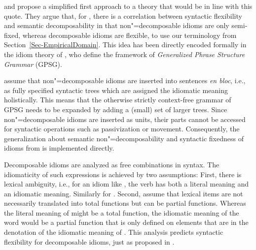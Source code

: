 \documentclass[output=paper
	        ,collection
	        ,collectionchapter
 	        ,biblatex
                ,babelshorthands
                ,newtxmath
                ,draftmode
                ,colorlinks, citecolor=brown
]{langscibook}
\begin{document}


\citet{WSN84a-u} and \citet{NSW94a} propose a simplified first approach to a theory that would be in line with this quote. They argue that, for , there is a correlation between syntactic flexibility and semantic decomposability in that non"=decomposable idioms are only semi-fixed, whereas decomposable idioms are flexible, to use our terminology from Section~\ref{Sec-EmpiricalDomain}. 
This idea has been directly encoded formally in the idiom theory of
\citet[Chapter~7]{GKPS85a}, who define the framework of 
\emph{Generalized Phrase Structure Grammar} (GPSG).

\citet{GKPS85a} assume that  non"=decomposable idioms are inserted into sentences \emph{en bloc}, i.e., as fully specified syntactic trees which are assigned the idiomatic meaning holistically. This means that the otherwise strictly context-free grammar of GPSG needs to be expanded by adding a (small) set of larger trees. 
Since non"=decomposable idioms are inserted as units, their parts cannot be accessed for syntactic operations such as passivization or movement. Consequently, the generalization about semantic non"=decomposability and syntactic fixedness of  idioms from \citet{WSN84a-u} is implemented directly.

Decomposable idioms are analyzed as free combinations in syntax. The idiomaticity of such expressions is achieved by two assumptions: First, there is lexical ambiguity, i.e., for an idiom like , the verb  has both a literal meaning and an idiomatic meaning. Similarly for .
Second, \citet{GKPS85a} assume that lexical items are not necessarily translated into total functions but can be partial functions. Whereas the literal meaning of  might be a total function, the idiomatic meaning of the word would be a partial function that is only defined on elements that are in the denotation of the idiomatic meaning of . This analysis predicts syntactic flexibility for decomposable idioms, just as proposed in \citet{WSN84a-u}.

\end{document}
